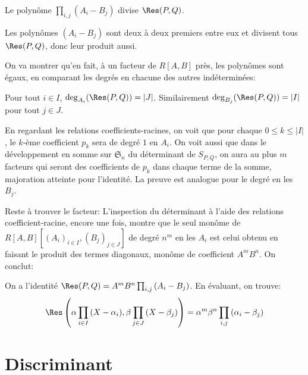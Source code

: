 \documentclass{article}
\begin{document}
\begin{proposition}
    Le polynôme $\prod_{i, j}{(A_i-B_j)}$ divise $\Res(P, Q)$.
\end{proposition}

\begin{preuve}
    Les polynômes $(A_i - B_j)$ sont deux à deux premiers entre eux et divisent tous $\Res(P, Q)$, donc leur produit aussi.\\
\end{preuve}

On va montrer qu'en fait, à un facteur de $R[A, B]$ près, les polynômes sont égaux, en comparant les degrés en chacune des autres indéterminées:

\begin{lemme}
    Pour tout $i \in I$, $\deg_{A_i}(\Res(P, Q)) = |J|$. Similairement $\deg_{B_j}(\Res(P, Q)) = |I|$ pour tout $j \in J$.
\end{lemme}

\begin{preuve}
    En regardant les relations coefficients-racines, on voit que pour chaque $0 \leq k \leq |I|$, le $k$-ème coefficient $p_k$ sera de degré $1$ en $A_i$. On voit aussi que dans le développement en somme sur $\mathfrak{S}_n$ du déterminant de $S_{P, Q}$, on aura au plus $m$ facteurs qui seront des coefficients de $p_k$ dans chaque terme de la somme, majoration atteinte pour l'identité. La preuve est analogue pour le degré en les $B_j$.\\
\end{preuve}

Reste à trouver le facteur: L'inspection du déterminant à l'aide des relations coefficient-racine, encore une fois, montre que le seul monôme de $R[A, B][(A_i)_{i \in I}, (B_j)_{j \in J}]$ de degré $n^m$ en les $A_i$ est celui obtenu en faisant le produit des termes diagonaux, monôme de coefficient $A^mB^n$. On conclut:

\begin{theoreme}
    On a l'identité $\Res(P, Q) = A^mB^n\prod_{i, j}{(A_i-B_j)}$. En évaluant, on trouve:
    $$\Res\left(\alpha \prod_{i \in I}{(X-\alpha_i)}, \beta\prod_{j \in J}{(X-\beta_j)}\right) =  \alpha^m\beta^n\prod_{i, j}{(\alpha_i-\beta_j)}$$
\end{theoreme}

\section{Discriminant}
\end{document}
